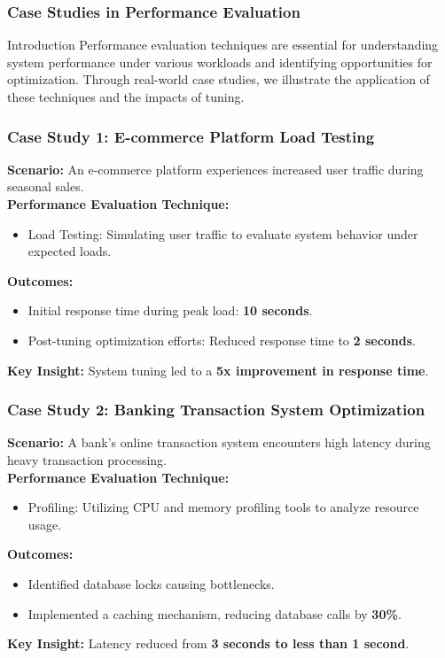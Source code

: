 \documentclass[aspectratio=169]{beamer}
\begin{document}
\begin{frame}[fragile]
  \frametitle{Case Studies in Performance Evaluation}
  \begin{block}{Introduction}
    Performance evaluation techniques are essential for understanding system performance under various workloads and identifying opportunities for optimization. Through real-world case studies, we illustrate the application of these techniques and the impacts of tuning.
  \end{block}
\end{frame}

\begin{frame}[fragile]
  \frametitle{Case Study 1: E-commerce Platform Load Testing}
  \textbf{Scenario:} An e-commerce platform experiences increased user traffic during seasonal sales.\\

  \textbf{Performance Evaluation Technique:}
  \begin{itemize}
    \item Load Testing: Simulating user traffic to evaluate system behavior under expected loads.
  \end{itemize}

  \textbf{Outcomes:}
  \begin{itemize}
    \item Initial response time during peak load: \textbf{10 seconds}.
    \item Post-tuning optimization efforts: Reduced response time to \textbf{2 seconds}.
  \end{itemize}

  \textbf{Key Insight:} System tuning led to a \textbf{5x improvement in response time}.
\end{frame}

\begin{frame}[fragile]
  \frametitle{Case Study 2: Banking Transaction System Optimization}
  \textbf{Scenario:} A bank's online transaction system encounters high latency during heavy transaction processing.\\

  \textbf{Performance Evaluation Technique:}
  \begin{itemize}
    \item Profiling: Utilizing CPU and memory profiling tools to analyze resource usage.
  \end{itemize}

  \textbf{Outcomes:}
  \begin{itemize}
    \item Identified database locks causing bottlenecks.
    \item Implemented a caching mechanism, reducing database calls by \textbf{30\%}.
  \end{itemize}

  \textbf{Key Insight:} Latency reduced from \textbf{3 seconds to less than 1 second}.
\end{frame}
\end{document}
